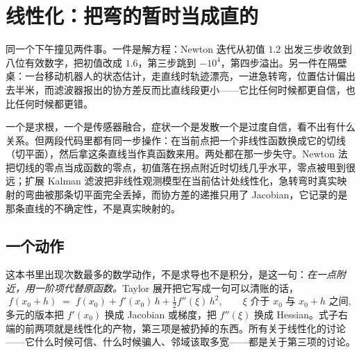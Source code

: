 \section{线性化：把弯的暂时当成直的}
\label{sec:18-Synthesis/02-Recurring-Ideas/01}

同一个下午撞见两件事。一件是解方程：Newton 迭代从初值 \(1.2\) 出发三步收敛到八位有效数字，把初值改成 \(1.6\)，第三步跳到 \(-10^{4}\)，第四步溢出。另一件在隔壁桌：一台移动机器人的状态估计，走直线时轨迹漂亮，一进急转弯，位置估计偏出去半米，而滤波器报出的协方差反而比直线段更小——它比任何时候都更自信，也比任何时候都更错。

一个是求根，一个是传感器融合，症状一个是发散一个是过度自信，看不出有什么关系。但两段代码里都有同一步操作：在当前点把一个非线性函数换成它的切线（切平面），然后拿这条直线当作真函数来用。两处都在那一步失守。Newton 法把切线的零点当成函数的零点，初值落在拐点附近时切线几乎水平，零点被甩到很远；扩展 Kalman 滤波把非线性观测模型在当前估计处线性化，急转弯时真实映射的弯曲被那条切平面完全丢掉，而协方差的递推只用了 Jacobian，它记录的是那条直线的不确定性，不是真实映射的。

\subsection{一个动作}

这本书里出现次数最多的数学动作，不是求导也不是积分，是这一句：\emph{在一点附近，用一阶项代替原函数。}Taylor 展开把它写成一句可以清账的话，
\[
  f(x_0+h) \;=\; f(x_0) + f'(x_0)\,h + \tfrac{1}{2} f''(\xi)\,h^{2},
  \qquad \xi \text{ 介于 } x_0 \text{ 与 } x_0+h \text{ 之间},
\]
多元的版本把 \(f'(x_0)\) 换成 Jacobian 或梯度，把 \(f''(\xi)\) 换成 Hessian。式子右端的前两项就是线性化的产物，第三项是被扔掉的东西。所有关于线性化的讨论——它什么时候可信、什么时候骗人、邻域该取多宽——都是关于第三项的讨论。

